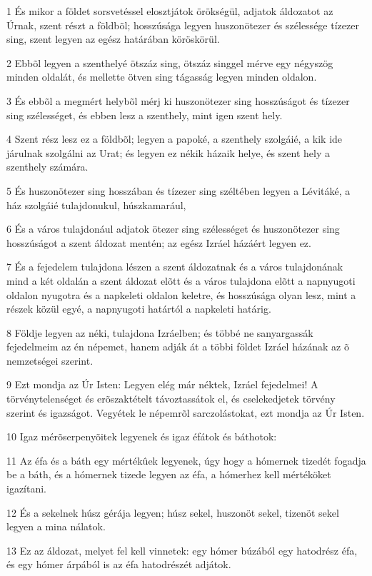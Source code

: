 \par 1 És mikor a földet sorsvetéssel elosztjátok örökségül, adjatok áldozatot az Úrnak, szent részt a földbõl; hosszúsága legyen huszonötezer és szélessége tízezer sing, szent legyen az egész határában köröskörül.
\par 2 Ebbõl legyen a szenthelyé ötszáz sing, ötszáz singgel mérve egy négyszög minden oldalát, és mellette ötven sing tágasság legyen minden oldalon.
\par 3 És ebbõl a megmért helybõl mérj ki huszonötezer sing hosszúságot és tízezer sing szélességet, és ebben lesz a szenthely, mint igen szent hely.
\par 4 Szent rész lesz ez a földbõl; legyen a papoké, a szenthely szolgáié, a kik ide járulnak szolgálni az Urat; és legyen ez nékik házaik helye, és szent hely a szenthely számára.
\par 5 És huszonötezer sing hosszában és tízezer sing széltében legyen a Lévitáké, a ház szolgáié tulajdonukul, húszkamarául,
\par 6 És a város tulajdonául adjatok ötezer sing szélességet és huszonötezer sing hosszúságot a szent áldozat mentén; az egész Izráel házáért legyen ez.
\par 7 És a fejedelem tulajdona lészen a szent áldozatnak és a város tulajdonának mind a két oldalán a szent áldozat elõtt és a város tulajdona elõtt a napnyugoti oldalon nyugotra és a napkeleti oldalon keletre, és hosszúsága olyan lesz, mint a részek közül egyé, a napnyugoti határtól a napkeleti határig.
\par 8 Földje legyen az néki, tulajdona Izráelben; és többé ne sanyargassák fejedelmeim az én népemet, hanem adják át a többi földet Izráel házának az õ nemzetségei szerint.
\par 9 Ezt mondja az Úr Isten: Legyen elég már néktek, Izráel fejedelmei! A törvénytelenséget és erõszaktételt távoztassátok el, és cselekedjetek törvény szerint és igazságot. Vegyétek le népemrõl sarczolástokat, ezt mondja az Úr Isten.
\par 10 Igaz mérõserpenyõitek legyenek és igaz éfátok és báthotok:
\par 11 Az éfa és a báth egy mértékûek legyenek, úgy hogy a hómernek tizedét fogadja be a báth, és a hómernek tizede legyen az éfa, a hómerhez kell mértéköket igazítani.
\par 12 És a sekelnek húsz gérája legyen; húsz sekel, huszonöt sekel, tizenöt sekel legyen a mina nálatok.
\par 13 Ez az áldozat, melyet fel kell vinnetek: egy hómer búzából egy hatodrész éfa, és egy hómer árpából is az éfa hatodrészét adjátok.
